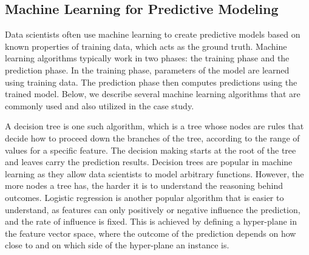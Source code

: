 \subsection{Machine Learning for Predictive Modeling}

Data scientists often use machine learning to create predictive models based on known properties of  training data, which acts as the ground truth. 
Machine learning algorithms typically work in two phases: the training phase and the prediction phase.
In the training phase, parameters of the model are
learned using training data.
The prediction phase then computes predictions using the trained model. %
Below, we describe several machine learning algorithms that are commonly used and also utilized in the case study.

A decision tree is one such algorithm, which is a tree whose nodes are rules that decide how to proceed down the branches of the tree, according to the range of values for a specific feature.  The decision making starts at the root of the tree and leaves carry the prediction results. Decision trees are popular in machine learning as they allow data scientists to model arbitrary functions.
However, the more nodes a tree has, the harder it is to understand the reasoning behind outcomes.
Logistic regression is another popular algorithm that is easier to understand, as features can only positively or negative influence the prediction, and the rate of influence is fixed.  This is achieved by defining a hyper-plane in the feature vector space, where the outcome of the prediction depends on how close to and on which side of the hyper-plane an instance is.


